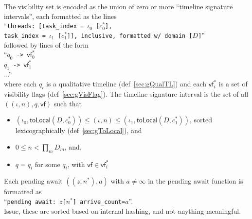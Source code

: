 The visibility set is encoded as the union of zero or more ``timeline signature intervals'', each formatted as the lines \\
``\texttt{threads: [task\_index = $\iota_0$ [$c_0^*$],}\\
\texttt{task\_index = $\iota_1$ [$c_1^*$]], inclusive, formatted w/ domain [$D$]}''\\
followed by lines of the form\\
``\texttt{$q_0$ -> $\mathsf{vf}_0^*$}\\
\hphantom{``}\texttt{$q_1$ -> $\mathsf{vf}_1^*$}\\
...''\\
where each $q_i$ is a qualitative timeline (def~\ref{sec:gQualTL}) and each $\mathsf{vf}_i^*$ is a set of visibility flags (def~\ref{sec:gVisFlag}).
The timeline signature interval is the set of all $((\iota, n), q, \mathsf{vf})$ such that
\begin{itemize}
  \item $(\iota_0, \mathsf{toLocal}(D, c_0^*)) \le (\iota, n) \le (\iota_1, \mathsf{toLocal}(D, c_1^*))$, sorted lexicographically (def~\ref{sec:gToLocal}), and
  \item $0 \le n < \prod_m D_m$, and,
  \item $q = q_i$ for some $q_i$, with $\mathsf{vf} \in \mathsf{vf}_i^*$
\end{itemize}
Each pending await $((z, n^*), a)$ with $a \ne \infty$ in the pending await function is formatted as \\
``\texttt{pending await: $z$[$n^*$] arrive\_count=$a$}''.\\
Issue, these are sorted based on internal hashing, and not anything meaningful.

